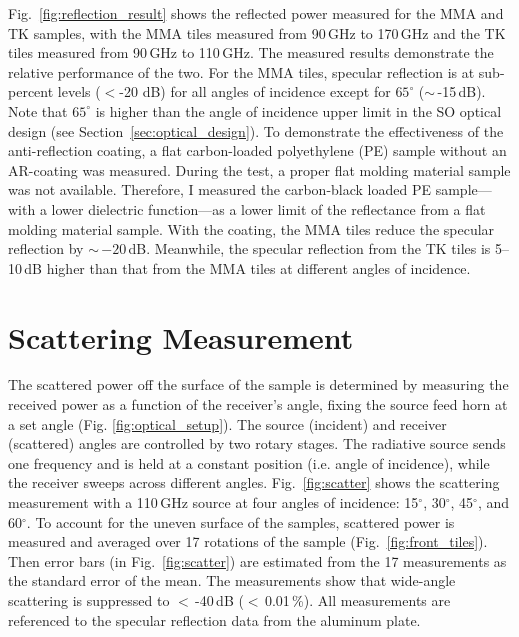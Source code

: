 Fig.~\ref{fig:reflection_result} shows the reflected power measured for the MMA and TK samples, with the MMA tiles measured from 90\,GHz to 170\,GHz and the TK tiles measured from 90\,GHz to 110\,GHz. The measured results demonstrate the relative performance of the two. For the MMA tiles, specular reflection is at sub-percent levels ($<$-20 dB) for all angles of incidence except for $65^{\circ}$ ($\sim$\,-15\,dB). Note that $65^{\circ}$ is higher than the angle of incidence upper limit in the SO optical design (see Section~\ref{sec:optical_design}). To demonstrate the effectiveness of the anti-reflection coating, a flat carbon-loaded polyethylene (PE) sample without an AR-coating was measured. During the test, a proper flat molding material sample was not available. Therefore, I measured the carbon-black loaded PE sample---with a lower dielectric function---as a lower limit of the reflectance from a flat molding material sample. With the coating, the MMA tiles reduce the specular reflection by $\sim$\,$-20$\,dB. Meanwhile, the specular reflection from the TK tiles is 5--10\,dB higher than that from the MMA tiles at different angles of incidence.


\section{Scattering Measurement}

The scattered power off the surface of the sample is determined by measuring the received power as a function of the receiver's angle, fixing the source feed horn at a set angle (Fig. \ref{fig:optical_setup}). The source (incident) and receiver (scattered) angles are controlled by two rotary stages. The radiative source sends one frequency and is held at a constant position (i.e. angle of incidence), while the receiver sweeps across different angles. Fig.~\ref{fig:scatter} shows the scattering measurement with a 110\,GHz source at four angles of incidence: 15$^{\circ}$, 30$^{\circ}$, 45$^{\circ}$, and 60$^{\circ}$. To account for the uneven surface of the samples, scattered power is measured and averaged over 17 rotations of the sample (Fig.~\ref{fig:front_tiles}). Then error bars (in Fig.~\ref{fig:scatter}) are estimated from the 17 measurements as the standard error of the mean. The measurements show that wide-angle scattering is suppressed to $<$\,-40\,dB ($<$\,0.01\,\%). All measurements are referenced to the specular reflection data from the aluminum plate. 

